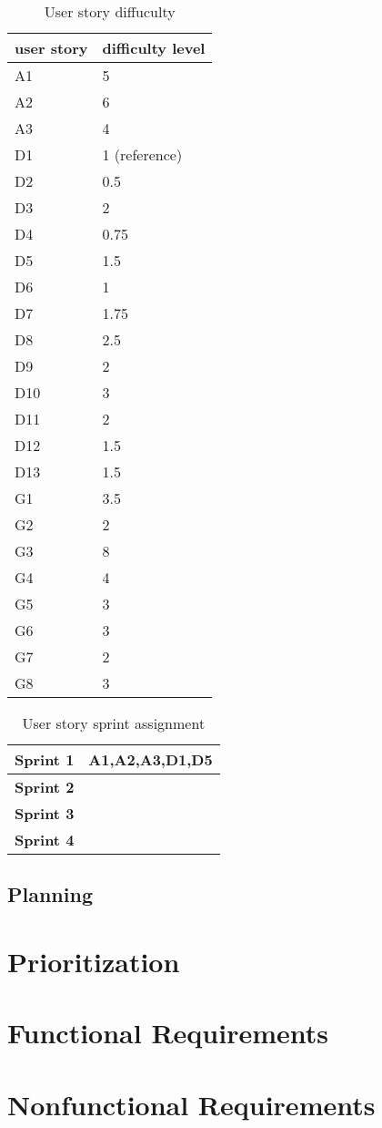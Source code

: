 


\begin{table}
\begin{tabular}{ | l | l | }
  \hline
  \textbf{user story} & \textbf{difficulty level} \\ \hline
  A1 & 5 \\ \hline
  A2 & 6 \\ \hline
  A3 & 4 \\ \hline
  D1 & 1 (reference) \\ \hline
  D2 & 0.5 \\ \hline
  D3 & 2 \\ \hline
  D4 & 0.75 \\ \hline
  D5 & 1.5 \\ \hline
  D6 & 1 \\ \hline
  D7 & 1.75 \\ \hline
  D8 & 2.5 \\ \hline
  D9 & 2 \\ \hline
  D10 & 3 \\ \hline
  D11 & 2 \\ \hline
  D12 & 1.5 \\ \hline
  D13 & 1.5 \\ \hline
  G1 & 3.5 \\ \hline
  G2 & 2 \\ \hline
  G3 & 8 \\ \hline
  G4 & 4 \\ \hline
  G5 & 3 \\ \hline
  G6 & 3 \\ \hline
  G7 & 2 \\ \hline
  G8 & 3 \\ \hline
\end{tabular}
\caption{User story diffuculty}
\end{table}


\begin{table}
\begin{tabular}{ | l | l | }
  \hline
  \textbf{Sprint 1} & A1,A2,A3,D1,D5 \\ \hline
  \textbf{Sprint 2} &  \\ \hline
  \textbf{Sprint 3} &  \\ \hline
  \textbf{Sprint 4} &  \\ \hline
\end{tabular}
\caption{User story sprint assignment}
\end{table}









\subsection{Planning}

\section{Prioritization}



\section{Functional Requirements}
\section{Nonfunctional Requirements}

